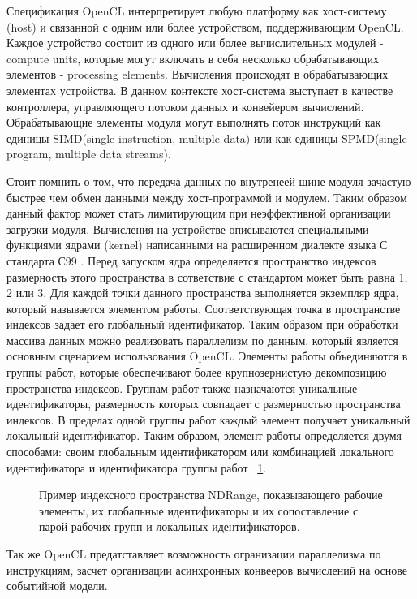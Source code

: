 Спецификация OpenCL интерпретирует любую платформу как хост-систему (host) и связанной с одним или более устройством, поддерживающим OpenCL. Каждое устройство состоит из одного или более вычислительных модулей - compute units,  которые  могут  включать  в  себя  несколько обрабатывающих элементов - processing elements. Вычисления  происходят  в обрабатывающих элементах устройства. В данном контексте хост-система выступает в качестве контроллера, управляющего потоком  данных и конвейером вычислений. Обрабатывающие элементы модуля могут выполнять поток инструкций как единицы SIMD(single instruction, multiple data)\cite{Flynn1972} или как единицы SPMD(single program, multiple data streams)\cite{Darema2011}.

Стоит помнить о том, что передача данных по внутренеей шине модуля зачастую быстрее чем обмен данными между хост-программой и модулем. Таким образом данный фактор может стать лимитирующим при неэффективной организации загрузки модуля. Вычисления на устройстве описываются специальными функциями ядрами (kernel) написанными на расширенном диалекте языка С стандарта С99 \cite{Kernighan1988, ISO:C99}. Перед запуском ядра определяется пространство индексов размерность этого пространства в сответствие с стандартом может быть равна 1, 2 или 3. Для каждой точки данного пространства выполняется экземпляр ядра, который называется элементом работы. Соответствующая точка в пространстве индексов задает его глобальный идентификатор. Таким образом при обработки массива данных можно реализовать параллелизм по данным, который является основным сценарием использования OpenCL. Элементы работы объединяются в группы работ, которые обеспечивают более крупнозернистую  декомпозицию пространства индексов. Группам работ также назначаются уникальные идентификаторы, размерность которых совпадает с размерностью пространства индексов. В пределах  одной группы работ каждый элемент получает уникальный локальный идентификатор. Таким образом, элемент работы определяется двумя способами: своим глобальным идентификатором или комбинацией локального идентификатора и идентификатора группы работ ~\ref{fig:ndrange}.
\begin{figure}[ht]
  \caption{Пример индексного пространства NDRange, показывающего рабочие элементы, их глобальные идентификаторы и их сопоставление с парой рабочих групп и локальных идентификаторов.}\label{fig:ndrange}
\end{figure}
Так же OpenCL предатставляет возможность огранизации параллелизма по инструкциям, засчет организации асинхронных конвееров вычислений на основе событийной модели.


